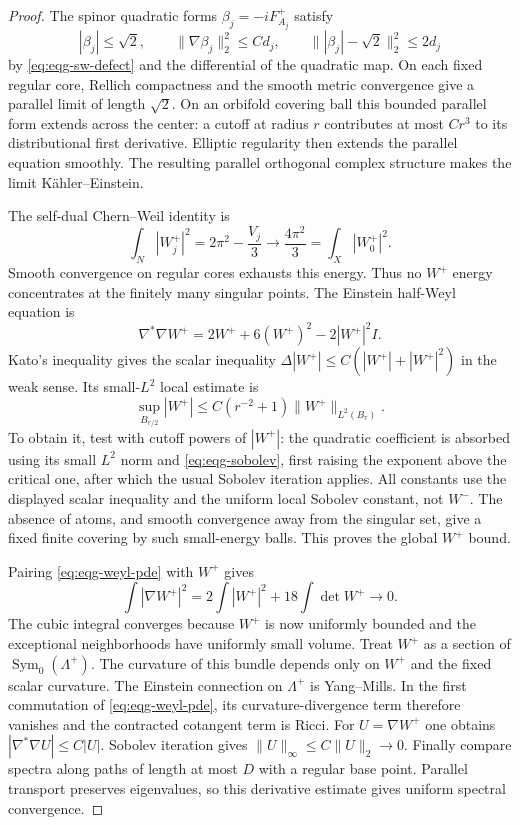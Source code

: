 \begin{proof}
The spinor quadratic forms $\beta_j=-iF_{A_j}^+$ satisfy
\[
 |\beta_j|\leq\sqrt2,\qquad
 \|\nabla\beta_j\|_2^2\leq Cd_j,\qquad
 \bigl\||\beta_j|-\sqrt2\bigr\|_2^2\leq2d_j
\]
by \eqref{eq:eqg-sw-defect} and the differential of the quadratic map.
On each fixed regular core, Rellich compactness and the smooth metric
convergence give a parallel limit of length $\sqrt2$.
On an orbifold covering ball this bounded parallel form extends across
the center: a cutoff at radius $r$ contributes at most $Cr^3$ to its
distributional first derivative.  Elliptic regularity then extends the
parallel equation smoothly.  The resulting parallel orthogonal complex
structure makes the limit Kähler--Einstein.

The self-dual Chern--Weil identity is
\[
 \int_N|W_j^+|^2=2\pi^2-\frac{V_j}{3}
 \longrightarrow\frac{4\pi^2}{3}
 =\int_X|W_0^+|^2.
\]
Smooth convergence on regular cores exhausts this energy.  Thus no
$W^+$ energy concentrates at the finitely many singular points.
The Einstein half-Weyl equation is
\begin{equation}\label{eq:eqg-weyl-pde}
 \nabla^*\nabla W^+=2W^++6(W^+)^2-2|W^+|^2I.
\end{equation}
Kato's inequality gives the scalar inequality
$\Delta|W^+|\leq C(|W^+|+|W^+|^2)$ in the weak sense.
Its small-$L^2$ local estimate is
\[
 \sup_{B_{r/2}}|W^+|
 \leq C(r^{-2}+1)\|W^+\|_{L^2(B_r)}.
\]
To obtain it, test with cutoff powers of $|W^+|$: the quadratic
coefficient is absorbed using its small $L^2$ norm and
\eqref{eq:eqg-sobolev}, first raising the exponent above the critical
one, after which the usual Sobolev iteration applies.  All constants
use the displayed scalar inequality and the uniform local Sobolev
constant, not $W^-$.  The absence of atoms, and smooth convergence
away from the singular set, give a fixed finite covering by such
small-energy balls.  This proves the global $W^+$ bound.

Pairing \eqref{eq:eqg-weyl-pde} with $W^+$ gives
\begin{equation}\label{eq:eqg-weyl-energy}
 \int|\nabla W^+|^2=2\int|W^+|^2+18\int\det W^+\longrightarrow0.
\end{equation}
The cubic integral converges because $W^+$ is now uniformly bounded
and the exceptional neighborhoods have uniformly small volume.
Treat $W^+$ as a section of $\operatorname{Sym}_0(\Lambda^+)$.
The curvature of this bundle depends only on $W^+$ and the fixed
scalar curvature.  The Einstein connection on $\Lambda^+$ is
Yang--Mills.  In the first commutation of
\eqref{eq:eqg-weyl-pde}, its curvature-divergence term therefore
vanishes and the contracted cotangent term is Ricci.  For
$U=\nabla W^+$ one obtains $|\nabla^*\nabla U|\leq C|U|$.
Sobolev iteration gives $\|U\|_\infty\leq C\|U\|_2\to0$.
Finally compare spectra along paths of length at most $D$ with a
regular base point.  Parallel transport preserves eigenvalues, so
this derivative estimate gives uniform spectral convergence.
\end{proof}

